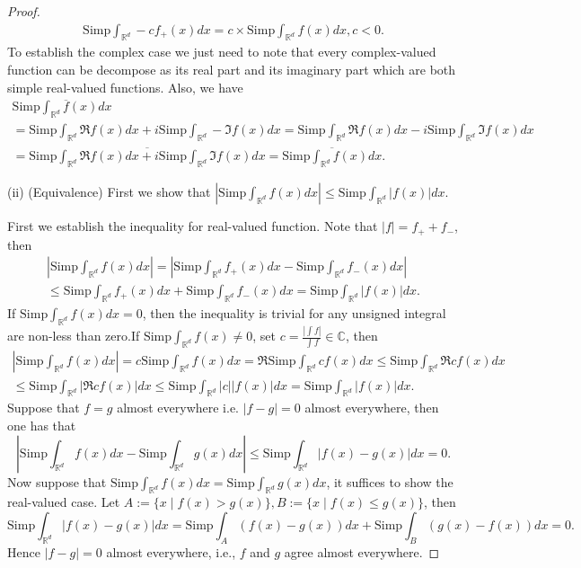 \documentclass[a4paper]{article}
\begin{document}
\begin{proof}
\begin{gather*}
    \mathrm{Simp}\int_{\mathbb{R}^d} -cf_+(x)dx = c \times \mathrm{Simp}\int_{\mathbb{R}^d} f(x) dx, c < 0.
\end{gather*}
To establish the complex case we just need to note that every complex-valued function can be decompose as its
real part and its imaginary part which are both simple real-valued functions. Also, we have \begin{multline*}
    \mathrm{Simp}\int_{\mathbb{R}^d} \overline{f}(x) dx \\= \mathrm{Simp}\int_{\mathbb{R}^d} \Re  f(x) dx + i
    \mathrm{Simp}\int_{\mathbb{R}^d} -\Im f(x) dx = \mathrm{Simp}\int_{\mathbb{R}^d} \Re  f(x) dx - i
    \mathrm{Simp}\int_{\mathbb{R}^d} \Im f(x) dx\\
    =\overline{\mathrm{Simp}\int_{\mathbb{R}^d} \Re  f(x) dx + i\mathrm{Simp}\int_{\mathbb{R}^d} \Im f(x) dx}
    = \overline{\mathrm{Simp}\int_{\mathbb{R}^d} f(x) dx}.
\end{multline*}

(ii) (Equivalence) First we show that 
$|\mathrm{Simp}\int_{\mathbb{R}^d} f(x) dx| \leq \mathrm{Simp}\int_{\mathbb{R}^d} |f(x)|dx$. 

First we establish the inequality for real-valued function. Note that $|f| = f_+ + f_-$, then \begin{multline*}
    |\mathrm{Simp}\int_{\mathbb{R}^d} f(x) dx| = |\mathrm{Simp}\int_{\mathbb{R}^d} f_+(x) dx - 
\mathrm{Simp}\int_{\mathbb{R}^d} f_-(x) dx| \\
\leq \mathrm{Simp}\int_{\mathbb{R}^d} f_+(x) dx + 
\mathrm{Simp}\int_{\mathbb{R}^d} f_-(x) dx = \mathrm{Simp}\int_{\mathbb{R}^d} |f(x)| dx.
\end{multline*}
If $\mathrm{Simp}\int_{\mathbb{R}^d} f(x) dx = 0$, then the inequality is trivial for any unsigned integral are
non-less than zero.If $\mathrm{Simp}\int_{\mathbb{R}^d} f(x) \ne 0$, set $c = \frac{|\int f|}{\int f} \in \mathbb{C}$,
then\begin{multline*}
    |\mathrm{Simp}\int_{\mathbb{R}^d} f(x) dx| = c\mathrm{Simp}\int_{\mathbb{R}^d} f(x) dx = 
    \Re \mathrm{Simp}\int_{\mathbb{R}^d} cf(x) dx \leq \mathrm{Simp}\int_{\mathbb{R}^d} \Re cf(x) dx 
    \\\leq \mathrm{Simp}\int_{\mathbb{R}^d} |\Re cf(x)| dx \leq \mathrm{Simp}\int_{\mathbb{R}^d} |c||f(x)|dx 
    = \mathrm{Simp}\int_{\mathbb{R}^d} |f(x)|dx.
\end{multline*}
Suppose that $f = g$ almost everywhere i.e. $|f - g| = 0$ almost everywhere, then one has that $$
|\mathrm{Simp}\int_{\mathbb{R}^d}f(x) dx - \mathrm{Simp}\int_{\mathbb{R}^d} g(x) dx|  \leq 
\mathrm{Simp}\int_{\mathbb{R}^d} |f(x) - g(x)| dx = 0.
$$
Now suppose that $\mathrm{Simp}\int_{\mathbb{R}^d} f(x) dx = \mathrm{Simp}\int_{\mathbb{R}^d} g(x) dx$, it suffices
to show the real-valued case. Let $A := \{x \mid f(x) > g(x)\}, B := \{x \mid f(x) \leq g(x)\}$, then$$
\mathrm{Simp}\int_{\mathbb{R}^d} |f(x) - g(x)| dx = \mathrm{Simp}\int_A (f(x) - g(x)) dx + 
\mathrm{Simp}\int_B (g(x) - f(x))dx = 0.
$$Hence $|f - g| = 0$ almost everywhere, i.e., $f$ and $g$ agree almost everywhere.


\end{proof}
\end{document}

